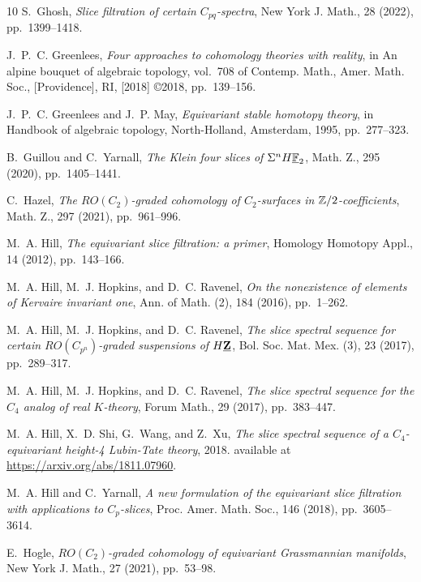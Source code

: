 \documentclass[a4paper,leqno,11pt]{amsart}
\theoremstyle{plain}
\theoremstyle{definition}
\theoremstyle{remark}
\theoremstyle{definition}
\numberwithin{equation}{section}
\begin{document}
\begin{thebibliography}{10}
{\sc S.~Ghosh}, {\em Slice filtration of certain {$C_{pq}$}-spectra}, New York
  J. Math., 28 (2022), pp.~1399--1418.

{\sc J.~P.~C. Greenlees}, {\em Four approaches to cohomology theories with
  reality}, in An alpine bouquet of algebraic topology, vol.~708 of Contemp.
  Math., Amer. Math. Soc., [Providence], RI, [2018] \copyright 2018,
  pp.~139--156.

{\sc J.~P.~C. Greenlees and J.~P. May}, {\em Equivariant stable homotopy
  theory}, in Handbook of algebraic topology, North-Holland, Amsterdam, 1995,
  pp.~277--323.

{\sc B.~Guillou and C.~Yarnall}, {\em The {K}lein four slices of
  {$\Sigma^nH\underline{\Bbb F}_2$}}, Math. Z., 295 (2020), pp.~1405--1441.

{\sc C.~Hazel}, {\em The {$RO(C_2)$}-graded cohomology of {$C_2$}-surfaces in
  {$\Bbb Z/2$}-coefficients}, Math. Z., 297 (2021), pp.~961--996.

{\sc M.~A. Hill}, {\em The equivariant slice filtration: a primer}, Homology
  Homotopy Appl., 14 (2012), pp.~143--166.

{\sc M.~A. Hill, M.~J. Hopkins, and D.~C. Ravenel}, {\em On the nonexistence of
  elements of {K}ervaire invariant one}, Ann. of Math. (2), 184 (2016),
  pp.~1--262.

{\sc M.~A. Hill, M.~J. Hopkins, and D.~C. Ravenel}, {\em The slice spectral
  sequence for certain {$RO(C_{p^n})$}-graded suspensions of {$H\underline{\bf
  Z}$}}, Bol. Soc. Mat. Mex. (3), 23 (2017), pp.~289--317.

{\sc M.~A. Hill, M.~J. Hopkins, and D.~C. Ravenel}, {\em The slice spectral
  sequence for the {$C_4$} analog of real {$K$}-theory}, Forum Math., 29
  (2017), pp.~383--447.

{\sc M.~A. Hill, X.~D. Shi, G.~Wang, and Z.~Xu}, {\em The slice spectral
  sequence of a {$C_4$}-equivariant height-4 {L}ubin-{T}ate theory}, 2018.
\newblock available at \url{https://arxiv.org/abs/1811.07960}.

{\sc M.~A. Hill and C.~Yarnall}, {\em A new formulation of the equivariant
  slice filtration with applications to {$C_p$}-slices}, Proc. Amer. Math.
  Soc., 146 (2018), pp.~3605--3614.

{\sc E.~Hogle}, {\em {$RO(C_2)$}-graded cohomology of equivariant
  {G}rassmannian manifolds}, New York J. Math., 27 (2021), pp.~53--98.


\end{thebibliography}
\end{document}
